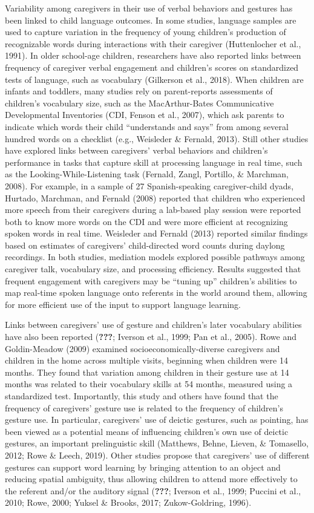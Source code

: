 \documentclass[
  english,
  man,floatsintext]{apa6}
\begin{document}
Variability among caregivers in their use of verbal behaviors and gestures has been linked to child language outcomes. In some studies, language samples are used to capture variation in the frequency of young children's production of recognizable words during interactions with their caregiver (Huttenlocher et al., 1991). In older school-age children, researchers have also reported links between frequency of caregiver verbal engagement and children's scores on standardized tests of language, such as vocabulary (Gilkerson et al., 2018). When children are infants and toddlers, many studies rely on parent-reports assessments of children's vocabulary size, such as the MacArthur-Bates Communicative Developmental Inventories (CDI, Fenson et al., 2007), which ask parents to indicate which words their child \enquote{understands and says} from among several hundred words on a checklist (e.g., Weisleder \& Fernald, 2013). Still other studies have explored links between caregivers' verbal behaviors and children's performance in tasks that capture skill at processing language in real time, such as the Looking-While-Listening task (Fernald, Zangl, Portillo, \& Marchman, 2008). For example, in a sample of 27 Spanish-speaking caregiver-child dyads, Hurtado, Marchman, and Fernald (2008) reported that children who experienced more speech from their caregivers during a lab-based play session were reported both to know more words on the CDI and were more efficient at recognizing spoken words in real time. Weisleder and Fernald (2013) reported similar findings based on estimates of caregivers' child-directed word counts during daylong recordings. In both studies, mediation models explored possible pathways among caregiver talk, vocabulary size, and processing efficiency. Results suggested that frequent engagement with caregivers may be \enquote{tuning up} children's abilities to map real-time spoken language onto referents in the world around them, allowing for more efficient use of the input to support language learning.

Links between caregivers' use of gesture and children's later vocabulary abilities have also been reported ({\textbf{???}}; Iverson et al., 1999; Pan et al., 2005). Rowe and Goldin-Meadow (2009) examined socioeconomically-diverse caregivers and children in the home across multiple visits, beginning when children were 14 months. They found that variation among children in their gesture use at 14 months was related to their vocabulary skills at 54 months, measured using a standardized test. Importantly, this study and others have found that the frequency of caregivers' gesture use is related to the frequency of children's gesture use. In particular, caregivers' use of deictic gestures, such as pointing, has been viewed as a potential means of influencing children's own use of deictic gestures, an important prelinguistic skill (Matthews, Behne, Lieven, \& Tomasello, 2012; Rowe \& Leech, 2019). Other studies propose that caregivers' use of different gestures can support word learning by bringing attention to an object and reducing spatial ambiguity, thus allowing children to attend more effectively to the referent and/or the auditory signal ({\textbf{???}}; Iverson et al., 1999; Puccini et al., 2010; Rowe, 2000; Yuksel \& Brooks, 2017; Zukow-Goldring, 1996).
\end{document}
